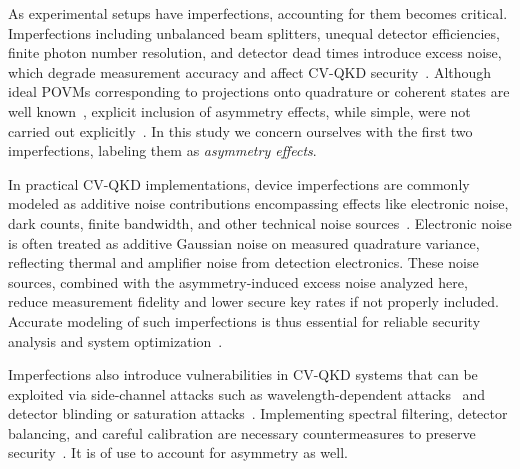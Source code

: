 \documentclass[%
reprint,
superscriptaddress,
 amsmath,amssymb,amsfonts,
 aps,
 pra,
 longbibliography
]{revtex4-2}
\begin{document}
As experimental setups have imperfections, accounting for them becomes critical. Imperfections including unbalanced beam splitters, unequal detector efficiencies, finite photon number resolution, and detector dead times introduce excess noise, which degrade measurement accuracy and affect CV-QKD security~\cite{PhysRevA.53.4528,len2022realistic,yeremenko2024realistic,reutov2021photon,hajomer2025finite,ruiz2023effects,Wang:23}. Although ideal POVMs corresponding to projections onto quadrature or coherent states are well known~\cite{Vogel:bk:2006,Richter:98}, explicit inclusion of asymmetry effects, while simple, were not carried out explicitly~\cite{PhysRevA.85.023820,PhysRevA.92.053835}. In this study we concern ourselves with the first two imperfections, labeling them as \textit{asymmetry effects}.

In practical CV-QKD implementations, device imperfections are commonly modeled as additive noise contributions encompassing effects like  electronic noise, dark counts, finite bandwidth, and other technical noise sources~\cite{Wang:23,ruiz2023effects,usenko2016trusted}. Electronic noise is often treated as additive Gaussian noise on measured quadrature variance, reflecting thermal and amplifier noise from detection electronics. These noise sources, combined with the asymmetry-induced excess noise analyzed here, reduce measurement fidelity and lower secure key rates if not properly included. Accurate modeling of such imperfections is thus essential for reliable security analysis and system optimization~\cite{Wang:23,ruiz2023effects}.

Imperfections also introduce vulnerabilities in CV-QKD systems that can be exploited via side-channel attacks such as wavelength-dependent attacks~\cite{huang2012wavelength,huang2014quantum} and detector blinding or saturation attacks~\cite{qin2018homodyne,qin2016quantum}. Implementing spectral filtering, detector balancing, and careful calibration are necessary countermeasures to preserve security~\cite{Wang:23,usenko2016trusted}. It is of use to account for asymmetry as well.

\end{document}
